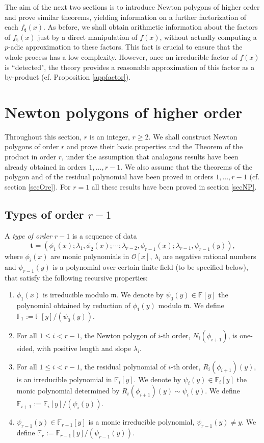 \documentclass{amsart}
\def\ff#1{\mathbb{F}_{#1}}
\def\la{\lambda}
\def\m{{\mathfrak m}}
\def\oo{{\mathcal O}}
\def\ty{\mathbf{t}}
\begin{document}
The aim of the next two sections is to introduce Newton polygons of higher order and prove similar theorems, yielding information on a further factorization of each $f_{\ty}(x)$. As before, we shall obtain arithmetic information about the factors of $f_{\ty}(x)$ just by a direct manipulation of $f(x)$, without actually computing a $p$-adic approximation to these factors. This fact is crucial to ensure that the whole process has a low complexity. However, once an irreducible factor of $f(x)$ is ``detected",  
the theory provides a reasonable approximation of this factor as a by-product (cf. Proposition \ref{appfactor}). 

\section{Newton polygons of higher order}\label{secNPr}
Throughout this section, $r$ is an integer, $r\ge 2$. We shall construct Newton polygons of order $r$ and prove their basic properties and the Theorem of the product in order $r$, under the assumption that analogous results have been already obtained in orders $1,\dots,r-1$. We also assume that the theorems of the polygon and of the residual polynomial have been proved in orders $1,\dots,r-1$ (cf. section \ref{secOre}). For $r=1$ all these results have been proved in section \ref{secNP}.

\subsection{Types of order $r-1$}
A \emph{type of order $r-1$} is a sequence of data
$$
\ty=(\phi_1(x);\la_1,\phi_2(x);\cdots;\la_{r-2},\phi_{r-1}(x);\la_{r-1},\psi_{r-1}(y)),
$$
where $\phi_i(x)$ are monic polynomials in $\oo[x]$, $\la_i$ are negative rational numbers and $\psi_{r-1}(y)$ is a polynomial over certain finite field (to be specified below), that satisfy the following recursive properties:
\begin{enumerate}
\item $\phi_1(x)$ is irreducible modulo $\m$. We denote by $\psi_0(y)\in\ff{}[y]$ the polynomial obtained by reduction of $\phi_1(y)$ modulo $\m$. We define $\ff1:=\ff{}[y]/(\psi_0(y))$. 
\item For all $1\le i<r-1$, the Newton polygon of $i$-th order, $N_i(\phi_{i+1})$, is one-sided, with positive length and slope $\la_i$. 
\item For all $1\le i<r-1$, the residual polynomial of $i$-th order, $R_i(\phi_{i+1})(y)$, is an irreducible polynomial in $\ff{i}[y]$. We denote by $\psi_i(y)\in \ff{i}[y]$ the monic polynomial determined by $R_i(\phi_{i+1})(y)\sim\psi_i(y)$. We define $\ff{i+1}:=\ff{i}[y]/(\psi_i(y))$.
\item $\psi_{r-1}(y)\in\ff{r-1}[y]$ is a monic irreducible polynomial, $\psi_{r-1}(y)\ne y$.  We define $\ff{r}:=\ff{r-1}[y]/(\psi_{r-1}(y))$.
\end{enumerate}
\end{document}
